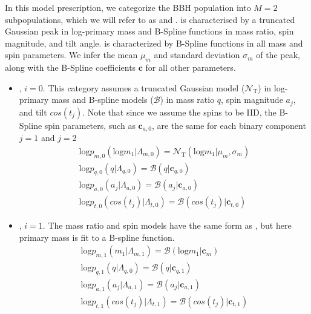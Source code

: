\subsubsection{\base{}} \label{sec:isopeak}
In this model prescription, we categorize the BBH population into $M=2$ subpopulations, which we will refer to as \popA{} and \popB{}. \popA is characterised by a truncated Gaussian peak in log-primary mass and B-Spline functions in mass ratio, spin magnitude, and tilt angle. \popB{} is characterized by B-Spline functions in all mass and spin parameters. We infer the mean $\mu_m$ and standard deviation $\sigma_m$ of the peak, along with the B-Spline coefficients $\mathbf{c}$ for all other parameters.

\begin{itemize}
    \item \popA{}, $i=0$. This category assumes a truncated Gaussian model ($\mathcal{N}_\text{T}$) in log-primary mass and B-spline models ($\mathcal{B}$) in mass ratio $q$, spin magnitude $a_j$, and tilt $cos(t_j)$. Note that since we assume the spins to be IID, the B-Spline spin parameters, such as $\mathbf{c}_{a,0}$, are the same for each binary component $j=1$ and $j=2$
    \begin{eqnarray} \label{eq:peakAbase}
        \text{log} p_{m,0}(\text{log} m_1| \Lambda_{m,0}) = \mathcal{N}_\text{T}(\text{log}m_1 | \mu_{m}, \sigma_{m}) \\
        \text{log} p_{q,0}(q| \Lambda_{q,0}) = \mathcal{B}(q | \mathbf{c}_{q,0}) \\
        \text{log} p_{a,0}(a_j| \Lambda_{a,0}) = \mathcal{B}(a_j | \mathbf{c}_{a,0}) \\
        \text{log} p_{t,0}(cos(t_j)| \Lambda_{t,0}) = \mathcal{B}( cos(t_j) | \mathbf{c}_{t,0})
    \end{eqnarray}

    \item \popB{}, $i=1$. The mass ratio and spin models have the same form as \popA{}, but here primary mass is fit to a B-spline function. 
    \begin{eqnarray} \label{eq:contBbase}
        \text{log} p_{m,1}(m_1| \Lambda_{m,1}) = \mathcal{B}( \text{log} m_1 | \mathbf{c}_{m}) \\
        \text{log} p_{q,1}(q| \Lambda_{q,0}) = \mathcal{B}(q | \mathbf{c}_{q,1}) \\
        \text{log} p_{a,1}(a_j| \Lambda_{a,1}) = \mathcal{B}(a_j | \mathbf{c}_{a,1}) \\
        \text{log} p_{t,1}(cos(t_j)| \Lambda_{t,1}) = \mathcal{B}( cos(t_j) | \mathbf{c}_{t,1})
    \end{eqnarray}

\end{itemize}


